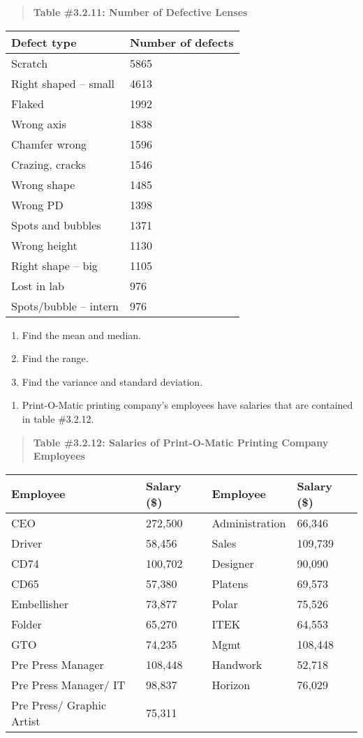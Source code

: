 \documentclass[]{book}
\providecommand{\tightlist}{%
  \setlength{\itemsep}{0pt}\setlength{\parskip}{0pt}}
\begin{document}
\begin{quote}
\textbf{Table \#3.2.11: Number of Defective Lenses}
\end{quote}

\begin{longtable}[]{@{}ll@{}}
\toprule
Defect type & Number of defects\tabularnewline
\midrule
\endhead
Scratch & 5865\tabularnewline
Right shaped -- small & 4613\tabularnewline
Flaked & 1992\tabularnewline
Wrong axis & 1838\tabularnewline
Chamfer wrong & 1596\tabularnewline
Crazing, cracks & 1546\tabularnewline
Wrong shape & 1485\tabularnewline
Wrong PD & 1398\tabularnewline
Spots and bubbles & 1371\tabularnewline
Wrong height & 1130\tabularnewline
Right shape -- big & 1105\tabularnewline
Lost in lab & 976\tabularnewline
Spots/bubble -- intern & 976\tabularnewline
\bottomrule
\end{longtable}

\begin{enumerate}
\def\labelenumi{\alph{enumi}.}
\item
  Find the mean and median.
\item
  Find the range.
\item
  Find the variance and standard deviation.
\end{enumerate}

\begin{enumerate}
\def\labelenumi{\arabic{enumi}.}
\setcounter{enumi}{4}
\tightlist
\item
  Print-O-Matic printing company's employees have salaries that are
  contained in table \#3.2.12.
\end{enumerate}

\begin{quote}
\textbf{Table \#3.2.12: Salaries of Print-O-Matic Printing Company
Employees}
\end{quote}

\begin{longtable}[]{@{}llll@{}}
\toprule
Employee & Salary (\$) & Employee & Salary (\$)\tabularnewline
\midrule
\endhead
CEO & 272,500 & Administration & 66,346\tabularnewline
Driver & 58,456 & Sales & 109,739\tabularnewline
CD74 & 100,702 & Designer & 90,090\tabularnewline
CD65 & 57,380 & Platens & 69,573\tabularnewline
Embellisher & 73,877 & Polar & 75,526\tabularnewline
Folder & 65,270 & ITEK & 64,553\tabularnewline
GTO & 74,235 & Mgmt & 108,448\tabularnewline
Pre Press Manager & 108,448 & Handwork & 52,718\tabularnewline
Pre Press Manager/ IT & 98,837 & Horizon & 76,029\tabularnewline
Pre Press/ Graphic Artist & 75,311 & &\tabularnewline
\bottomrule
\end{longtable}
\end{document}
